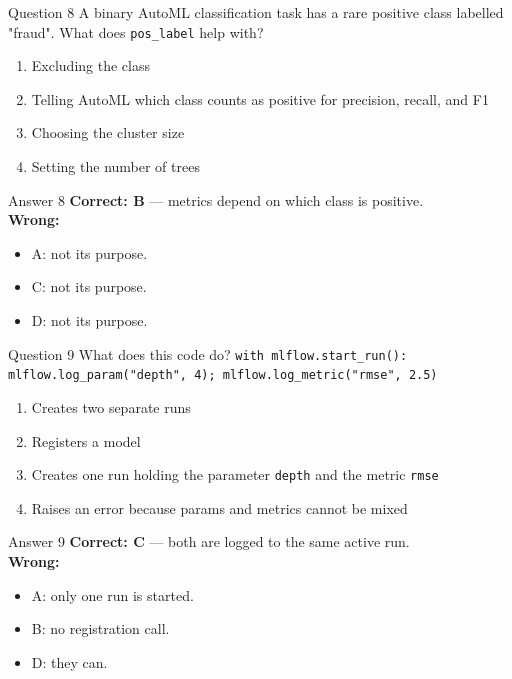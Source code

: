 \documentclass[aspectratio=169,11pt]{beamer}
\begin{document}
\begin{frame}{Question 8}
A binary AutoML classification task has a rare positive class labelled "fraud". What does \texttt{pos\_label} help with?
\begin{enumerate}[label=\Alph*.]
\item Excluding the class
\item Telling AutoML which class counts as positive for precision, recall, and F1
\item Choosing the cluster size
\item Setting the number of trees
\end{enumerate}
\end{frame}
\begin{frame}{Answer 8}
\textbf{Correct: B} --- metrics depend on which class is positive.\\
\vspace{0.5em}
\textbf{Wrong:}
\begin{itemize}
\item A: not its purpose.
\item C: not its purpose.
\item D: not its purpose.
\end{itemize}
\end{frame}

\begin{frame}{Question 9}
What does this code do?  \texttt{with mlflow.start\_run(): mlflow.log\_param("depth", 4); mlflow.log\_metric("rmse", 2.5)}
\begin{enumerate}[label=\Alph*.]
\item Creates two separate runs
\item Registers a model
\item Creates one run holding the parameter \texttt{depth} and the metric \texttt{rmse}
\item Raises an error because params and metrics cannot be mixed
\end{enumerate}
\end{frame}
\begin{frame}{Answer 9}
\textbf{Correct: C} --- both are logged to the same active run.\\
\vspace{0.5em}
\textbf{Wrong:}
\begin{itemize}
\item A: only one run is started.
\item B: no registration call.
\item D: they can.
\end{itemize}
\end{frame}
\end{document}
